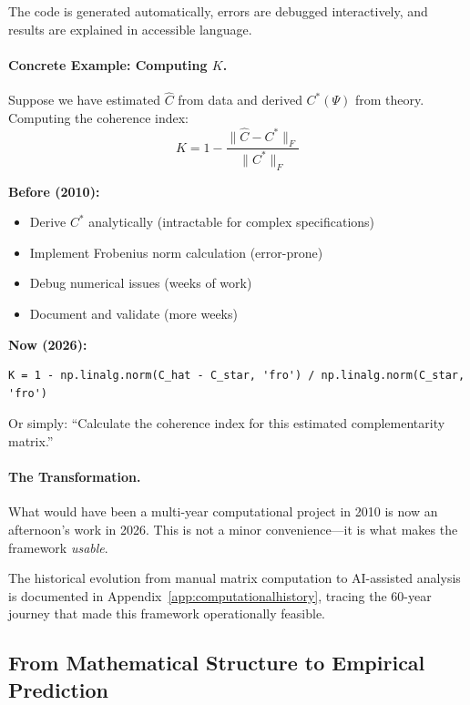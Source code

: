 The code is generated automatically, errors are debugged interactively,
and results are explained in accessible language.

\paragraph{Concrete Example: Computing $K$.}
Suppose we have estimated $\hat{C}$ from data and derived $C^*(\Psi)$ from theory.
Computing the coherence index:
\begin{equation}
  K = 1 - \frac{\|\hat{C} - C^*\|_F}{\|C^*\|_F}
\end{equation}

\textbf{Before (2010):}
\begin{itemize}
  \item Derive $C^*$ analytically (intractable for complex specifications)
  \item Implement Frobenius norm calculation (error-prone)
  \item Debug numerical issues (weeks of work)
  \item Document and validate (more weeks)
\end{itemize}

\textbf{Now (2026):}
\begin{verbatim}
K = 1 - np.linalg.norm(C_hat - C_star, 'fro') / np.linalg.norm(C_star, 'fro')
\end{verbatim}

Or simply: ``Calculate the coherence index for this estimated complementarity matrix.''

\paragraph{The Transformation.}
What would have been a multi-year computational project in 2010
is now an afternoon's work in 2026.
This is not a minor convenience---it is what makes the framework \emph{usable}.

The historical evolution from manual matrix computation to AI-assisted analysis
is documented in Appendix~\ref{app:computationalhistory}, tracing the 60-year
journey that made this framework operationally feasible.

\subsection{From Mathematical Structure to Empirical Prediction}

